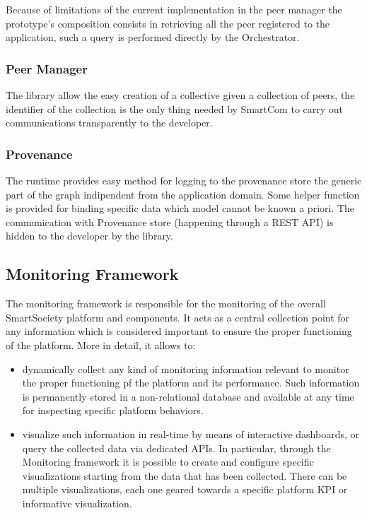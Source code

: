 Because of limitations of the current implementation in the peer manager the prototype's composition consists in retrieving all the peer registered to the application, such a query is performed directly by the Orchestrator.

\subsubsection{Peer Manager}
The library allow the easy creation of a collective given a collection of peers, the identifier of the collection is the only thing needed by SmartCom to carry out communications transparently to the developer.

\subsubsection{Provenance}
The runtime provides easy method for logging to the provenance store the generic part of the graph indipendent from the application domain. Some helper function is provided for binding specific data which model cannot be known a priori.
The communication with Provenance store (happening through a REST API) is hidden to the developer by the library.

\subsection{Monitoring Framework}
The monitoring framework is responsible for the monitoring of the overall SmartSociety platform and components. It acts as a central collection point for any information which is considered important to ensure the proper functioning of the platform. More in detail, it allows to:
\begin{itemize}
\item dynamically collect any kind of monitoring information relevant to monitor the proper functioning pf the platform and its performance. Such information is permanently stored in a non-relational database and available at any time for inspecting specific platform behaviors.
\item visualize such information in real-time by means of interactive dashboards, or query the collected data via dedicated APIs. In particular, through the Monitoring framework it is possible to create and configure specific visualizations starting from the data that has been collected. There can be multiple visualizations, each one geared towards a specific platform KPI or informative visualization.
\end{itemize} 

